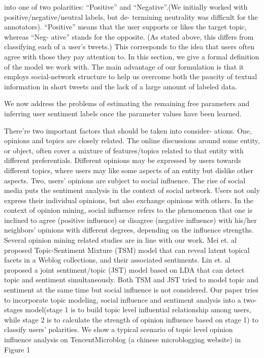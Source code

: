 \documentclass[runningheads,a4paper]{llncs}
\begin{document}
into one of two polarities: “Positive” and “Negative”.(We initially worked with positive/negative/neutral labels, but de- termining neutrality was difficult for the annotators). “Positive” means that the user supports or likes the target topic, whereas “Neg- ative” stands for the opposite. (As stated above, this differs from classifying each of a user’s tweets.)
This corresponds to the idea that users often agree with those they pay attention to.
In this section, we give a formal definition of the model we work
with. 
The main advantage of our formulation is that it employs social-network structure to help us overcome both the paucity of textual information in short tweets and the lack of a large amount of labeled data.


We now address the problems of estimating the remaining free parameters and inferring user sentiment labels once the parameter values have been learned.

There’re two important factors that should be taken into consider- ations. One, opinions and topics are closely related. The online discussions around some entity, or object, often cover a mixture of features/topics related to that entity with different preferentials. Different opinions may be expressed by users towards different topics, where users may like some aspects of an entity but dislike other aspects. Two, users’ opinions are subject to social influence. The rise of social media puts the sentiment analysis in the context of social network. Users not only express their individual opinions, but also exchange opinions with others. In the context of opinion mining, social influence refers to the phenomenon that one is inclined to agree (positive influence) or disagree (negative influence) with his/her neighbors’ opinions with different degrees, depending on the influence strengths.
Several opinion mining related studies are in line with
our work. Mei et. al \cite{mei2007topic} proposed Topic-Sentiment Mixture (TSM) model that can reveal latent topical facets in a Weblog collections, and their associated sentiments. Lin et. al \cite{lin2009joint} proposed a joint sentiment/topic (JST) model based on LDA that can detect topic and sentiment simultaneously. Both TSM and JST tried to model topic and sentiment at the same time but social influence is not considered. Our paper tries to incorporate topic modeling, social influence and sentiment analysis into a two-stages model(stage 1 is to build topic level influential relationship among users, while stage 2 is to calculate the strength of opinion influence based on stage 1) to classify users’ polarities.
We show a typical scenario of topic level opinion influence analysis on TencentMicroblog (a chinese microblogging website) in Figure 1
\end{document}
